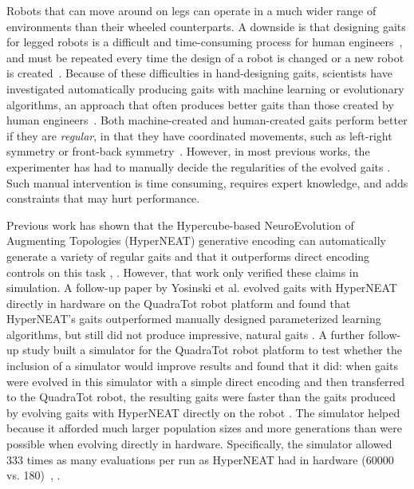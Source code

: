 Robots that can move around on legs can operate in a much wider range of environments than their wheeled counterparts. A downside is that designing gaits for legged robots is a difficult and time-consuming process for human engineers~\cite{ridder storm, wetter green}, and must be repeated every time the design of a robot is changed or a new robot is created~\cite{hornby1}. 
Because of these difficulties in hand-designing gaits, scientists have investigated automatically producing gaits with machine learning or evolutionary algorithms, an approach that often produces better gaits than those created by human engineers~\cite{valsalam:mii,kohl:stone,hornby1,hornby2,yos:clune}. Both machine-created and human-created gaits perform better if they are \emph{regular}, in that they have coordinated movements, such as left-right symmetry or front-back symmetry~\cite{valsalam:mii,clune2,clune1,clune3}.
However, in most previous works, the experimenter has had to manually decide the regularities of the evolved gaits \cite{valsalam:mii,tellez,beer,raibert} . 
Such manual intervention is time consuming, requires expert knowledge, and adds constraints that may hurt performance. 

Previous work has shown that the Hypercube-based NeuroEvolution of Augmenting Topologies (HyperNEAT) generative encoding \cite{stanley1} can automatically generate a variety of regular gaits and that it outperforms direct encoding controls on this task \cite{clune1}, \cite{clune2}. 
However, that work only verified these claims in simulation. 
A follow-up paper by Yosinski et al. evolved gaits with HyperNEAT directly in hardware on the QuadraTot robot platform and found that HyperNEAT's gaits outperformed manually designed parameterized learning algorithms, but still did not produce impressive, natural gaits \cite{yos:clune}. 
A further follow-up study built a simulator for the QuadraTot robot platform to test whether the inclusion of a simulator would improve results and found that it did:  when gaits were evolved in this simulator with a simple direct encoding and then transferred to the QuadraTot robot, the resulting gaits were faster than the gaits produced by evolving gaits with HyperNEAT directly on the robot \cite{glette}. 
The simulator helped because it afforded much larger population sizes and more generations than were possible when evolving directly in hardware. Specifically, the simulator allowed 333 times as many evaluations per run as HyperNEAT had in hardware (60000 vs. 180)~\cite{yos:clune}, \cite{glette}. 

